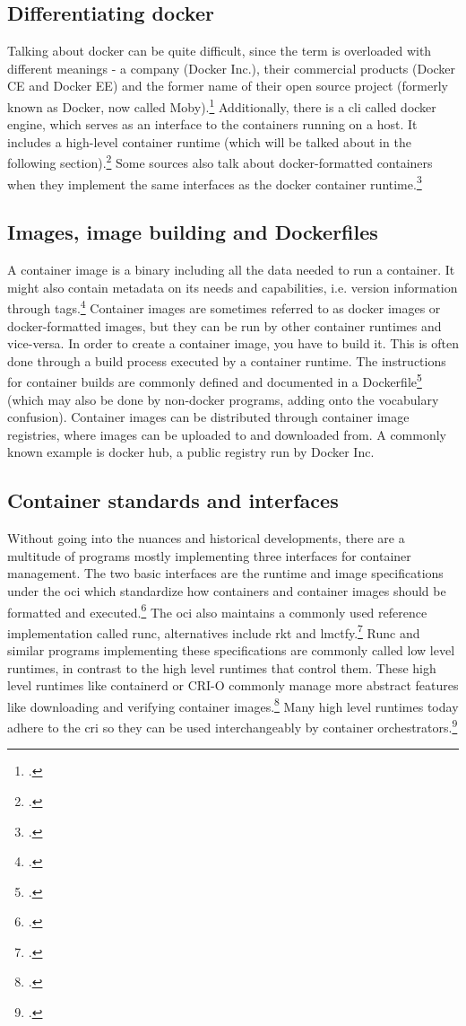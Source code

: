 \subsection{Differentiating docker}
Talking about docker can be quite difficult, since the term is overloaded with different meanings - a company (Docker Inc.), their commercial products (Docker CE and Docker EE) and the former name of their open source project (formerly known as Docker, now called Moby).\footcite{dockerMoby}
Additionally, there is a \gls{cli} called docker engine, which serves as an interface to the containers running on a host. It includes a high-level container runtime (which will be talked about in the following section).\footcite{dockerEngine}
Some sources also talk about docker-formatted containers when they implement the same interfaces as the docker container runtime.\footcite{dockerFormatted}

\subsection{Images, image building and Dockerfiles}
A container image is a binary including all the data needed to run a container. It might also contain metadata on its needs and capabilities, i.e. version information through tags.\footcite{redhatImages}
Container images are sometimes referred to as docker images or docker-formatted images, but they can be run by other container runtimes and vice-versa.
In order to create a container image, you have to build it. This is often done through a build process executed by a container runtime. The instructions for container builds are commonly defined and documented in a Dockerfile\footcite{dockerfileDocs} (which may also be done by non-docker programs, adding onto the vocabulary confusion).
Container images can be distributed through container image registries, where images can be uploaded to and downloaded from. A commonly known example is docker hub, a public registry run by Docker Inc.

\subsection{Container standards and interfaces} \label{runtimes}

Without going into the nuances and historical developments, there are a multitude of programs mostly implementing three interfaces for container management.
The two basic interfaces are the runtime and image specifications under the \gls{oci} which standardize how containers and container images should be formatted and executed.\footcite{ociStandards}
The \gls{oci} also maintains a commonly used reference implementation called runc, alternatives include rkt and lmctfy.\footcite{lowLevelRuntimes}
Runc and similar programs implementing these specifications are commonly called low level runtimes, in contrast to the high level runtimes that control them.
These high level runtimes like containerd or CRI-O commonly manage more abstract features like downloading and verifying container images.\footcite{highLevelRuntimes}
Many high level runtimes today adhere to the \gls{cri} so they can be used interchangeably by container orchestrators.\footcite{criDocs}

